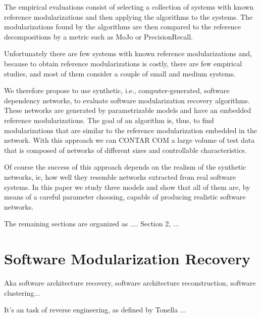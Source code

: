 The empirical evaluations consist of selecting a collection of systems with
known reference modularizations and then applying the algorithms to the systems.
The modularizations found by the algorithms are then compared to the reference
decompositions by a metric such as MoJo \cite{Tzerpos1999} or PrecisionRecall.


Unfortunately there are few systems with known reference modularizations and,
because to obtain reference modularizations is costly, there are few empirical
studies, and most of them consider a couple of small and medium systems.

We therefore propose to use synthetic, i.e., computer-generated, software
dependency networks, to evaluate software modularization recovery algorithms.
These networks are generated by parametrizable models and have an embedded
reference modularizations. The goal of an algorithm is, thus, to find
modularizations that are similar to the reference modularization embedded in the
network. With this approach we can CONTAR COM a large volume of test data that
is composed of networks of different sizes and controllable characteristics.

Of course the success of this approach depends on the realism of the synthetic
networks, ie, how well they resemble networks extracted from real software
systems. In this paper we study three models and show that all of them are, by
means of a careful parameter choosing, capable of producing realistic software
networks.

The remaining sections are organized as .... Section 2, ...


\section{Software Modularization Recovery}

Aka software architecture recovery, software architecture reconstruction,
software clustering...

It's an task of reverse engineering, as defined by Tonella \cite{Tonella2007}...


